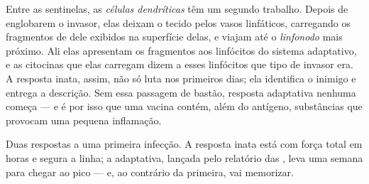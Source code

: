 \begin{proposition}\label{prop:g12:innate-immunity:handover}
Entre as  sentinelas, as \emph{células
dendríticas} têm um segundo trabalho. Depois
de englobarem o invasor, elas deixam o tecido pelos vasos linfáticos,
carregando os fragmentos de  dele exibidos na superfície delas,
e viajam até o \emph{linfonodo} mais próximo. Ali elas apresentam os
fragmentos aos linfócitos do sistema adaptativo, e as citocinas que
elas carregam dizem a esses linfócitos que tipo de invasor era. A
resposta inata, assim, não só luta nos primeiros dias; ela identifica o
inimigo e entrega a descrição. Sem essa passagem de bastão, resposta
adaptativa nenhuma começa --- e é por isso que uma vacina contém, além
do antígeno, substâncias que provocam uma pequena inflamação.
\end{proposition}
\admitted

\begin{omfigure}

{\small Duas respostas a uma primeira infecção. A resposta inata está
com força total em horas e segura a linha; a adaptativa, lançada pelo
relatório das , leva uma semana para chegar ao pico
--- e, ao contrário da primeira, vai memorizar.}
\end{omfigure}


